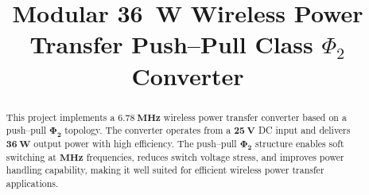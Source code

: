 \documentclass[journal, 9pt, letterpaper, english]{IEEEtran}[2015/08/26]
\begin{document}
\title{Modular \qty{36}{\watt} Wireless Power Transfer Push--Pull Class $\Phi_2$ Converter}

\author{%
}


\maketitle

\begin{abstract}
	This project implements a $\mathbf{\qty{6.78}{\mega\hertz}}$ wireless power transfer converter based on a push--pull $\symbf{\Phi_2}$ topology.
	The converter operates from a $\mathbf{\qty{25}{\volt}}$ DC input and delivers $\mathbf{\qty{36}{\watt}}$ output power with high efficiency.
	The push--pull $\symbf{\Phi_2}$ structure enables soft switching at $\mathbf{\unit{\mega\hertz}}$ frequencies, reduces switch voltage stress, and improves power handling capability, making it well suited for efficient wireless power transfer applications.
\end{abstract}

%
\IEEEpeerreviewmaketitle
\end{document}
